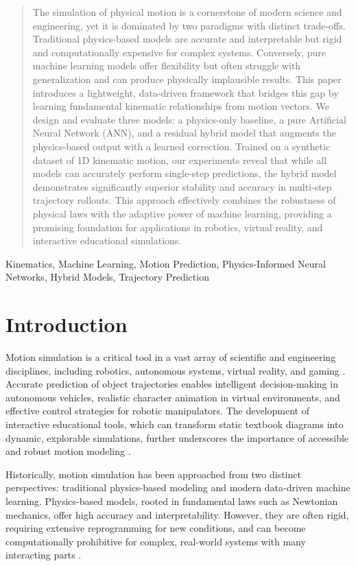 \documentclass[conference]{IEEEtran}
\begin{document}
\begin{abstract}
The simulation of physical motion is a cornerstone of modern science and engineering, yet it is dominated by two paradigms with distinct trade-offs. Traditional physics-based models are accurate and interpretable but rigid and computationally expensive for complex systems. Conversely, pure machine learning models offer flexibility but often struggle with generalization and can produce physically implausible results. This paper introduces a lightweight, data-driven framework that bridges this gap by learning fundamental kinematic relationships from motion vectors. We design and evaluate three models: a physics-only baseline, a pure Artificial Neural Network (ANN), and a residual hybrid model that augments the physics-based output with a learned correction. Trained on a synthetic dataset of 1D kinematic motion, our experiments reveal that while all models can accurately perform single-step predictions, the hybrid model demonstrates significantly superior stability and accuracy in multi-step trajectory rollouts. This approach effectively combines the robustness of physical laws with the adaptive power of machine learning, providing a promising foundation for applications in robotics, virtual reality, and interactive educational simulations.
\end{abstract}

\begin{IEEEkeywords}
Kinematics, Machine Learning, Motion Prediction, Physics-Informed Neural Networks, Hybrid Models, Trajectory Prediction
\end{IEEEkeywords}

\section{Introduction}
Motion simulation is a critical tool in a vast array of scientific and engineering disciplines, including robotics, autonomous systems, virtual reality, and gaming \cite{b1}. Accurate prediction of object trajectories enables intelligent decision-making in autonomous vehicles, realistic character animation in virtual environments, and effective control strategies for robotic manipulators. The development of interactive educational tools, which can transform static textbook diagrams into dynamic, explorable simulations, further underscores the importance of accessible and robust motion modeling \cite{b2}.

Historically, motion simulation has been approached from two distinct perspectives: traditional physics-based modeling and modern data-driven machine learning. Physics-based models, rooted in fundamental laws such as Newtonian mechanics, offer high accuracy and interpretability. However, they are often rigid, requiring extensive reprogramming for new conditions, and can become computationally prohibitive for complex, real-world systems with many interacting parts \cite{b3, b4}.
\end{document}
